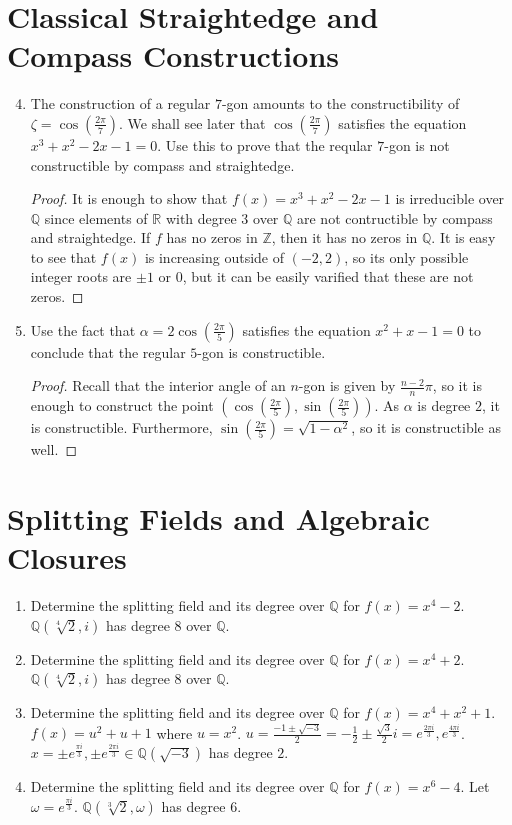 \documentclass{report}
\newcommand{\Z}{\mathbb{Z}}
\newcommand{\Q}{\mathbb{Q}}
\newcommand{\R}{\mathbb{R}}
\begin{document}
\section{Classical Straightedge and Compass Constructions}
\begin{enumerate} 
	\setcounter{enumi}{3}
	\item The construction of a regular $7$-gon amounts to the constructibility of $\zeta = \cos(\frac{2\pi}{7})$.
		We shall see later that $\cos(\frac{2\pi}{7})$ satisfies the equation $x^3+x^2-2x-1=0$. Use this to prove that the reqular $7$-gon is not constructible by compass and straightedge.
		\begin{proof}
			It is enough to show that $f(x)=x^3+x^2-2x-1$ is irreducible over $\Q$ since elements of $\R$ with degree $3$ over $\Q$ are not contructible by compass and straightedge.
			If $f$ has no zeros in $\Z$, then it has no zeros in $\Q$. It is easy to see that $f(x)$ is increasing outside of $(-2,2)$, so its only possible integer roots are $\pm 1$ or $0$,
			but it can be easily varified that these are not zeros.
		\end{proof}
	\item  Use the fact that $\alpha=2\cos(\frac{2\pi}{5})$ satisfies the equation $x^2+x-1=0$ to conclude that the regular $5$-gon is constructible.
		\begin{proof}
			Recall that the interior angle of an $n$-gon is given by $\frac{n-2}{n}\pi$, so it is enough to construct the point $(\cos(\frac{2\pi}{5}),\sin(\frac{2\pi}{5}))$. 
			As $\alpha$ is degree $2$, it is constructible. Furthermore, $\sin(\frac{2\pi}{5})=\sqrt{1-\alpha^2}$, so it is constructible as well.
		\end{proof}
\end{enumerate}
\section{Splitting Fields and Algebraic Closures}
\begin{enumerate} 
	\item Determine the splitting field and its degree over $\Q$ for $f(x)=x^4-2$.
		\newline
		$\Q(\sqrt[4]{2},i)$ has degree $8$ over $\Q$.
	\item Determine the splitting field and its degree over $\Q$ for $f(x)=x^4+2$.
		\newline
		$\Q(\sqrt[4]{2},i)$ has degree $8$ over $\Q$.
	\item Determine the splitting field and its degree over $\Q$ for $f(x)=x^4+x^2+1$.
		\newline
		$f(x)=u^2+u+1$ where $u=x^2$. $u=\frac{-1\pm\sqrt{-3}}{2}=-\frac{1}{2}\pm \frac{\sqrt{3}}{2}i=e^{\frac{2\pi i}{3}},e^{\frac{4\pi i }{3}}$. $x=\pm e^{\frac{\pi i}{3}},\pm e^{\frac{2\pi i}{3}}\in\Q(\sqrt{-3})$ has degree $2$.
	\item Determine the splitting field and its degree over $\Q$ for $f(x)=x^6-4$.
		\newline
		Let $\omega=e^{\frac{\pi i}{3}}$. $\Q(\sqrt[3]{2},\omega)$ has degree $6$.
\end{enumerate}
\end{document}
